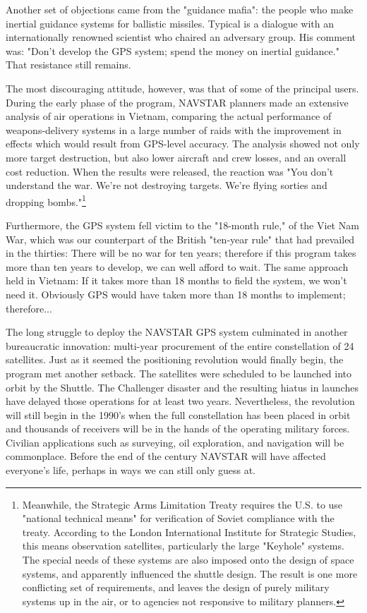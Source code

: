 Another set of objections came from the "guidance mafia": the people who make inertial guidance systems for ballistic missiles. Typical is a dialogue with an internationally renowned scientist who chaired an adversary group. His comment was: "Don't develop the GPS system; spend the money on inertial guidance." That resistance still remains.

The most discouraging attitude, however, was that of some of the principal users. During the early phase of the program, NAVSTAR planners made an extensive analysis of air operations in Vietnam, comparing the actual performance of weapons-delivery systems in a large number of raids with the improvement in effects which would result from GPS-level accuracy. The analysis showed not only more target destruction, but also lower aircraft and crew losses, and an overall cost reduction. When the results were released, the reaction was "You don't understand the war. We're not destroying targets. We're flying sorties and dropping bombs."\footnote{Meanwhile, the Strategic Arms Limitation Treaty requires the U.S. to use "national technical means" for verification of Soviet compliance with the treaty. According to the London International Institute for Strategic Studies, this means observation satellites, particularly the large "Keyhole" systems. The special needs of these systems are also imposed onto the design of space systems, and apparently influenced the shuttle design. The result is one more conflicting set of requirements, and leaves the design of purely military systems up in the air, or to agencies not responsive to military planners.}

Furthermore, the GPS system fell victim to the "18-month rule," of the Viet Nam War, which was our counterpart of the British "ten-year rule" that had prevailed in the thirties: There will be no war for ten years; therefore if this program takes more than ten years to develop, we can well afford to wait. The same approach held in Vietnam: If it takes more than 18 months to field the system, we won't need it. Obviously GPS would have taken more than 18 months to implement; therefore...

The long struggle to deploy the NAVSTAR GPS system culminated in another bureaucratic innovation: multi-year procurement of the entire constellation of 24 satellites. Just as it seemed the positioning revolution would finally begin, the program met another setback. The satellites were scheduled to be launched into orbit by the Shuttle. The Challenger disaster and the resulting hiatus in launches have delayed those operations for at least two years. Nevertheless, the revolution will still begin in the 1990's when the full constellation has been placed in orbit and thousands of receivers will be in the hands of the operating military forces. Civilian applications such as surveying, oil exploration, and navigation will be commonplace. Before the end of the century NAVSTAR will have affected everyone's life, perhaps in ways we can still only guess at.

